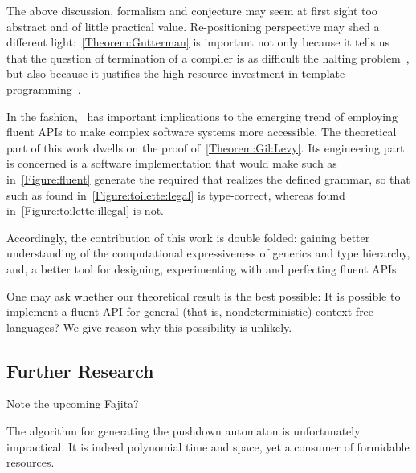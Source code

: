 The above discussion, formalism and conjecture may seem at first sight too abstract
  and of little practical value.
Re-positioning perspective may shed a different light:~\cref{Theorem:Gutterman} is important not only because it tells us
  that the question of termination of a \CC compiler is as difficult
  the halting problem~\cite{Turing:1936}, but also because it
  justifies the high resource investment in
  template programming~\cite{Musser:Stepanov:1989,Dehnert:Stepanov:2000
  ,Backhouse:Jansson:1999, Austern:1998,Bracha:Odersky:Stoutamire:Wadler:98,X:Garcia:Jarvi:Lumsdaine:Siek:Willcock:03}.

In the fashion,~ has important
  implications to the emerging trend of employing fluent APIs
  to make complex software systems more accessible.
The theoretical part of this work dwells on the proof of~\cref{Theorem:Gil:Levy}.
Its engineering part is concerned is
  a software implementation that would make \Java
  such as in~\cref{Figure:fluent} generate
  the required \Java that realizes the
  defined grammar, so that \Java such as
  found in~\cref{Figure:toilette:legal} is type-correct,
  whereas \Java found in~\cref{Figure:toilette:illegal} is not.

Accordingly, the contribution of this work is double folded:
  gaining better understanding of the computational expressiveness of
  \Java generics and type hierarchy, and, a better tool
  for designing, experimenting with and perfecting fluent APIs.

One may ask whether our theoretical result is the
  best possible:
It is possible to implement a fluent API for general
  (that is, nondeterministic) context free languages?
  We give reason why this possibility is unlikely.

\subsection{Further Research}
Note the upcoming \textsf{Fajita}?

The algorithm for generating the pushdown automaton is unfortunately impractical.
It is indeed polynomial time and space,
  yet a consumer of formidable resources.
